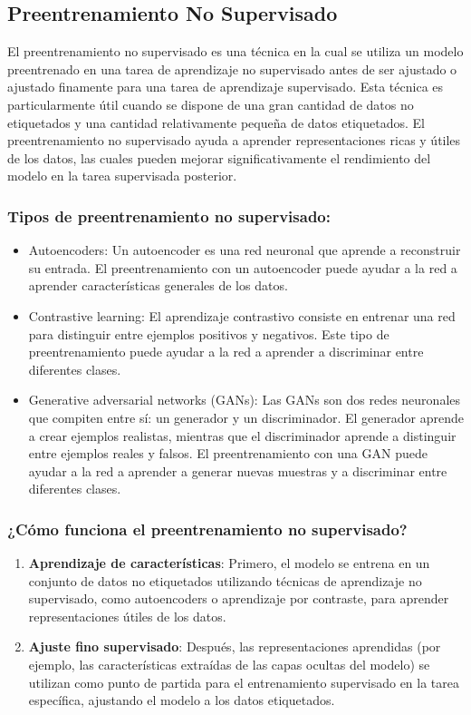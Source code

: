 \documentclass[11pt]{article}
\begin{document}
\subsection{Preentrenamiento No Supervisado}
\label{sec:org7163906}
El preentrenamiento no supervisado es una técnica en la cual se utiliza
un modelo preentrenado en una tarea de aprendizaje no supervisado antes
de ser ajustado o ajustado finamente para una tarea de aprendizaje
supervisado. Esta técnica es particularmente útil cuando se dispone de
una gran cantidad de datos no etiquetados y una cantidad relativamente
pequeña de datos etiquetados. El preentrenamiento no supervisado ayuda a
aprender representaciones ricas y útiles de los datos, las cuales pueden
mejorar significativamente el rendimiento del modelo en la tarea
supervisada posterior.

\subsubsection{Tipos de preentrenamiento no supervisado:}
\label{sec:org480755a}
\begin{itemize}
\item Autoencoders: Un autoencoder es una red neuronal que aprende a
reconstruir su entrada. El preentrenamiento con un autoencoder puede
ayudar a la red a aprender características generales de los datos.
\item Contrastive learning: El aprendizaje contrastivo consiste en entrenar
una red para distinguir entre ejemplos positivos y negativos. Este
tipo de preentrenamiento puede ayudar a la red a aprender a
discriminar entre diferentes clases.
\item Generative adversarial networks (GANs): Las GANs son dos redes
neuronales que compiten entre sí: un generador y un discriminador. El
generador aprende a crear ejemplos realistas, mientras que el
discriminador aprende a distinguir entre ejemplos reales y falsos. El
preentrenamiento con una GAN puede ayudar a la red a aprender a
generar nuevas muestras y a discriminar entre diferentes clases.
\end{itemize}

\subsubsection{¿Cómo funciona el preentrenamiento no supervisado?}
\label{sec:orgcd06e90}
\begin{enumerate}
\item \textbf{Aprendizaje de características}: Primero, el modelo se entrena en un
conjunto de datos no etiquetados utilizando técnicas de aprendizaje
no supervisado, como autoencoders o aprendizaje por contraste, para
aprender representaciones útiles de los datos.
\item \textbf{Ajuste fino supervisado}: Después, las representaciones aprendidas
(por ejemplo, las características extraídas de las capas ocultas del
modelo) se utilizan como punto de partida para el entrenamiento
supervisado en la tarea específica, ajustando el modelo a los datos
etiquetados.
\end{enumerate}
\end{document}

